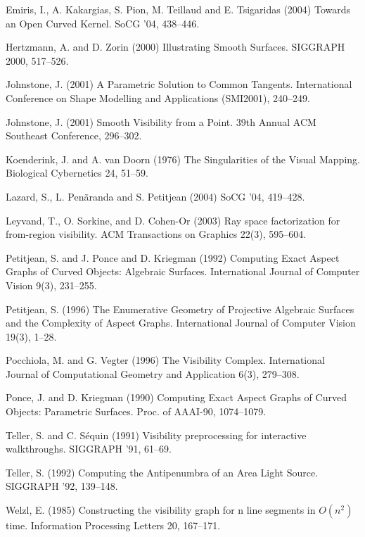 \documentclass[10pt,twocolumn]{article}
\begin{document}
\begin{thebibliography}{}
Emiris, I., A. Kakargias, S. Pion, M. Teillaud and E. Tsigaridas (2004)
Towards an Open Curved Kernel.
SoCG '04, 438--446.

Hertzmann, A. and D. Zorin (2000)
Illustrating Smooth Surfaces.
SIGGRAPH 2000, 517--526.

Johnstone, J. (2001)
A Parametric Solution to Common Tangents.
International Conference on Shape Modelling and Applications (SMI2001),
240--249.

Johnstone, J. (2001)
Smooth Visibility from a Point.
39th Annual ACM Southeast Conference, 296--302.

Koenderink, J. and A. van Doorn (1976)
The Singularities of the Visual Mapping.
Biological Cybernetics 24, 51--59.

Lazard, S., L. Pen\~aranda and S. Petitjean (2004)
SoCG '04, 419--428.

Leyvand, T., O. Sorkine, and D. Cohen-Or (2003)
Ray space factorization for from-region visibility.
ACM Transactions on Graphics 22(3), 595--604.

Petitjean, S. and J. Ponce and D. Kriegman (1992)
Computing Exact Aspect Graphs of Curved Objects: Algebraic Surfaces.
International Journal of Computer Vision 9(3), 231--255.

Petitjean, S. (1996)
The Enumerative Geometry of Projective Algebraic Surfaces and
the Complexity of Aspect Graphs.
International Journal of Computer Vision 19(3), 1--28.

Pocchiola, M. and G. Vegter (1996)
The Visibility Complex.
International Journal of Computational Geometry and Application 6(3),
279--308.

Ponce, J. and D. Kriegman (1990)
Computing Exact Aspect Graphs of Curved Objects: Parametric Surfaces.
Proc. of AAAI-90, 1074--1079.

Teller, S. and C. S\'{e}quin (1991)
Visibility preprocessing for interactive walkthroughs.
SIGGRAPH '91, 61--69.

Teller, S. (1992)
Computing the Antipenumbra of an Area Light Source.
SIGGRAPH '92, 139--148.

Welzl, E. (1985) 
Constructing the visibility graph for n line segments
in $O(n^2)$ time.
Information Processing Letters 20, 167--171.

\end{thebibliography}
\end{document}
